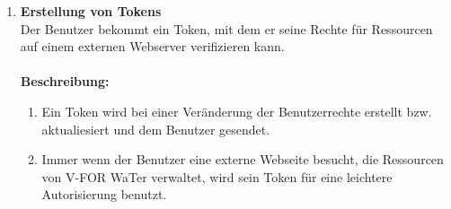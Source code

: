 \documentclass[parskip=full,11pt]{scrartcl}
\def\threedigits#1{%
  \ifnum#1<10 0\fi
  \ifnum#1<1 0\fi
  \number#1}
\begin{document}
\begin{enumerate}[label={\textbf{/F\protect\threedigits{\theenumi}0/}}, leftmargin=*]
\begin{enumerate}[label=(\arabic*), leftmargin=*]
\end{enumerate}
\newpage
\item \label{FAB10} \colorbox{shadecolor}{\textbf{Erstellung von Tokens}}\\ Der Benutzer bekommt ein Token, mit dem er seine Rechte für Ressourcen auf einem externen Webserver verifizieren kann.\\\\
\textbf{Beschreibung:}\\
\begin{enumerate}[label=(\arabic*), leftmargin=*]
\item Ein Token wird bei einer Veränderung der Benutzerrechte erstellt bzw. aktualiesiert und dem Benutzer gesendet. 
\item Immer wenn der Benutzer eine externe Webseite besucht, die Ressourcen von V-FOR WaTer verwaltet, wird sein Token für eine leichtere Autorisierung benutzt. 

\end{enumerate}

\end{enumerate}
\end{document}
